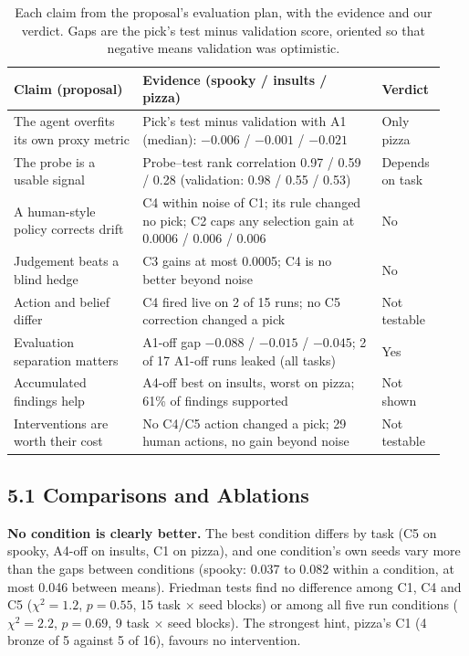 \documentclass[11pt]{article}
\begin{document}
\begin{table}[tb]
\centering
\small
\begin{tabular}{@{}p{0.29\linewidth}p{0.52\linewidth}p{0.13\linewidth}@{}}
\toprule
\textbf{Claim (proposal)} & \textbf{Evidence (spooky / insults / pizza)} & \textbf{Verdict} \\
\midrule
The agent overfits its own proxy metric & Pick's test minus validation with A1 (median):
  $-0.006$ / $-0.001$ / $-0.021$ & Only pizza \\
The probe is a usable signal & Probe--test rank correlation 0.97 / 0.59 / 0.28
  (validation: 0.98 / 0.55 / 0.53) & Depends on task \\
A human-style policy corrects drift & C4 within noise of C1; its rule changed no pick; C2
  caps any selection gain at 0.0006 / 0.006 / 0.006 & No \\
Judgement beats a blind hedge & C3 gains at most 0.0005; C4 is no better beyond
  noise & No \\
Action and belief differ & C4 fired live on 2 of 15 runs; no C5 correction changed a
  pick & Not testable \\
Evaluation separation matters & A1-off gap $-0.088$ / $-0.015$ / $-0.045$; 2 of 17
  A1-off runs leaked (all tasks) & Yes \\
Accumulated findings help & A4-off best on insults, worst on pizza; 61\% of findings
  supported & Not shown \\
Interventions are worth their cost & No C4/C5 action changed a pick; 29 human actions,
  no gain beyond noise & Not testable \\
\bottomrule
\end{tabular}
\caption{Each claim from the proposal's evaluation plan, with the evidence and our
verdict. Gaps are the pick's test minus validation score, oriented so that negative means
validation was optimistic.}
\label{tab:claims}
\end{table}

\subsection*{5.1 Comparisons and Ablations}

\textbf{No condition is clearly better.} The best condition differs by task (C5 on
spooky, A4-off on insults, C1 on pizza), and one condition's own seeds vary more than
the gaps between conditions (spooky: 0.037 to 0.082 within a condition, at most 0.046
between means). Friedman tests find no difference among C1, C4 and C5 ($\chi^2 = 1.2$,
$p = 0.55$, 15 task $\times$ seed blocks) or among all five run conditions ($\chi^2 = 2.2$, $p = 0.69$,
9 task $\times$ seed blocks). The strongest hint, pizza's C1 (4 bronze of 5 against 5 of 16), favours
no intervention.
\end{document}
